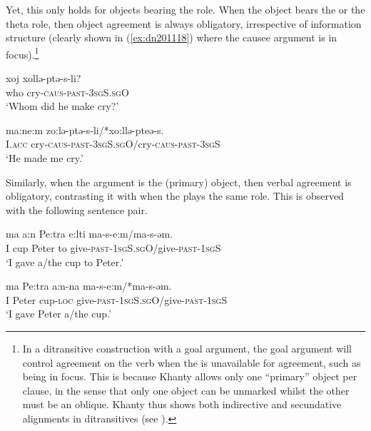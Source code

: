 \documentclass[output=paper
,modfonts
,nonflat]{langsci/langscibook}
\begin{document}
Yet, this only holds for objects bearing the \theme{} role.
When the object bears the \goal{} or the \causee{} theta role, then object agreement is always obligatory, irrespective of information structure (clearly shown in (\ref{ex:dn201118}) where the causee argument is in focus).\footnote{In a ditransitive construction with a goal argument, the goal argument will control agreement on the verb when the \theme{} is unavailable for agreement, such as being in focus.
This is because Khanty allows only one ``primary'' object per clause, in the sense that only one object can be unmarked whilst the other must be an oblique.
Khanty thus shows both indirective and secundative alignments in ditransitives (see \citealt{haspelmath2005,Barany2015}).
} 

\begin{exe}
\ex \citet[][149]{dn2011}
\begin{xlist}
\ex
{\gll xoj xollə-ptə-s-li?\\
who cry-\textsc{caus-past-3sgS.sgO}\\
\glt `Whom did he make cry?'} \label{ex:dn201118}

\ex
{\gll ma:ne:m zo:lə-ptə-s-li/*xo:llə-pteə-s.\\
I.\textsc{acc} cry-\textsc{caus-past-3sgS.sgO}/cry-\textsc{caus-past-3sgS}\\
\glt `He made me cry.'} \label{ex:dn201119}

\end{xlist}
\end{exe}

\noindent Similarly, when the \goal{} argument is the (primary) object, then verbal agreement is obligatory, contrasting it with when the \theme{} plays the same role. 
This is observed with the following sentence pair. 

\begin{exe}
\ex \citet[][148]{dn2011}
\begin{xlist}
\ex
{\gll ma a:n Pe:tra e:lti ma-s-e:m/ma-s-əm.\\
I cup Peter to give-\textsc{past-1sgS.sgO}/give-\textsc{past-1sgS}\\
\glt `I gave a/the cup to Peter.'}

\ex
{\gll ma Pe:tra a:n-na ma-s-e:m/*ma-s-əm.\\
I Peter cup-\textsc{loc} give-\textsc{past-1sgS.sgO}/give-\textsc{past-1sgS}\\
\glt `I gave Peter a/the cup.'}
\end{xlist}
\end{exe}
\end{document}
